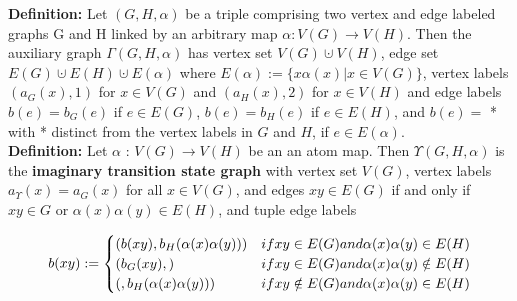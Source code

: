 \documentclass[a4,12pt]{article}
\theoremstyle{plain}
\numberwithin{theorem}{section}
\begin{document}
\textbf{Definition:} Let $(G, H, \alpha)$ be a triple comprising two vertex and edge
labeled graphs G and H linked by an arbitrary map $\alpha : V(G) \rightarrow V(H)$.
Then the auxiliary graph $\Gamma(G, H, \alpha)$ has vertex set $V(G) \cupdot V(H)$,
 edge set $E(G) \cupdot E(H) \cupdot E(\alpha)$ where $E(\alpha) := \{x \alpha(x)|x \in V (G)\}$,
 vertex labels $(a_G(x), 1)$ for $x \in V(G)$ and $(a_H(x), 2)$ for $x \in V(H)$ and edge labels
 $b(e) = b_G(e)$ if $e \in E(G)$, $b(e) = b_H(e)$ if $e \in E(H)$, and $b(e) =$ * with *
distinct from the vertex labels in $G$ and $H$, if $e \in E(\alpha)$.\\

\textbf{Definition:} Let $\alpha$ : $V(G) \rightarrow V(H)$ be an an atom map. Then $\Upsilon(G, H, \alpha)$
is the \textbf{imaginary transition state graph} with vertex set $V(G)$, vertex labels $a_\Upsilon (x) = a_G (x)$ for all
$x \in V(G)$, and edges $xy \in E(G)$ if and only if $xy \in G$ or $\alpha(x)\alpha(y) \in E(H)$,
and tuple edge labels

$$
b(xy) := \begin{cases}
(b (xy), b_H(\alpha(x)\alpha(y))) & if xy \in E(G) and \alpha(x)\alpha(y) \in E(H) \\
(b_G(xy), \* ) & if xy \in E(G) and \alpha(x)\alpha(y) \notin E(H) \\
(\* , b_H(\alpha(x)\alpha(y)))  & if xy \notin E(G) and \alpha(x)\alpha(y) \in E(H)
\end{cases}
$$
\end{document}
